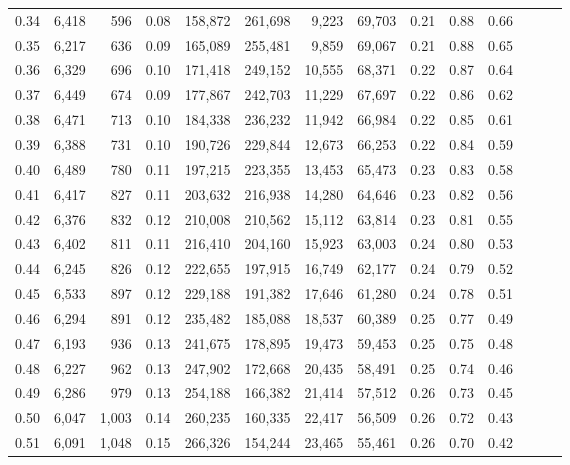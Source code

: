 \begin{tabular}{rrrrrrrrrrrrrr}
0.34 &   6,418 &    596 &  0.08 &  158,872 &  261,698 &   9,223 &  69,703 &  0.21 &  0.88 &      0.66 \\
0.35 &   6,217 &    636 &  0.09 &  165,089 &  255,481 &   9,859 &  69,067 &  0.21 &  0.88 &      0.65 \\
0.36 &   6,329 &    696 &  0.10 &  171,418 &  249,152 &  10,555 &  68,371 &  0.22 &  0.87 &      0.64 \\
0.37 &   6,449 &    674 &  0.09 &  177,867 &  242,703 &  11,229 &  67,697 &  0.22 &  0.86 &      0.62 \\
0.38 &   6,471 &    713 &  0.10 &  184,338 &  236,232 &  11,942 &  66,984 &  0.22 &  0.85 &      0.61 \\
0.39 &   6,388 &    731 &  0.10 &  190,726 &  229,844 &  12,673 &  66,253 &  0.22 &  0.84 &      0.59 \\
0.40 &   6,489 &    780 &  0.11 &  197,215 &  223,355 &  13,453 &  65,473 &  0.23 &  0.83 &      0.58 \\
0.41 &   6,417 &    827 &  0.11 &  203,632 &  216,938 &  14,280 &  64,646 &  0.23 &  0.82 &      0.56 \\
0.42 &   6,376 &    832 &  0.12 &  210,008 &  210,562 &  15,112 &  63,814 &  0.23 &  0.81 &      0.55 \\
0.43 &   6,402 &    811 &  0.11 &  216,410 &  204,160 &  15,923 &  63,003 &  0.24 &  0.80 &      0.53 \\
0.44 &   6,245 &    826 &  0.12 &  222,655 &  197,915 &  16,749 &  62,177 &  0.24 &  0.79 &      0.52 \\
0.45 &   6,533 &    897 &  0.12 &  229,188 &  191,382 &  17,646 &  61,280 &  0.24 &  0.78 &      0.51 \\
0.46 &   6,294 &    891 &  0.12 &  235,482 &  185,088 &  18,537 &  60,389 &  0.25 &  0.77 &      0.49 \\
0.47 &   6,193 &    936 &  0.13 &  241,675 &  178,895 &  19,473 &  59,453 &  0.25 &  0.75 &      0.48 \\
0.48 &   6,227 &    962 &  0.13 &  247,902 &  172,668 &  20,435 &  58,491 &  0.25 &  0.74 &      0.46 \\
0.49 &   6,286 &    979 &  0.13 &  254,188 &  166,382 &  21,414 &  57,512 &  0.26 &  0.73 &      0.45 \\
0.50 &   6,047 &  1,003 &  0.14 &  260,235 &  160,335 &  22,417 &  56,509 &  0.26 &  0.72 &      0.43 \\
0.51 &   6,091 &  1,048 &  0.15 &  266,326 &  154,244 &  23,465 &  55,461 &  0.26 &  0.70 &      0.42 \\

\end{tabular}
